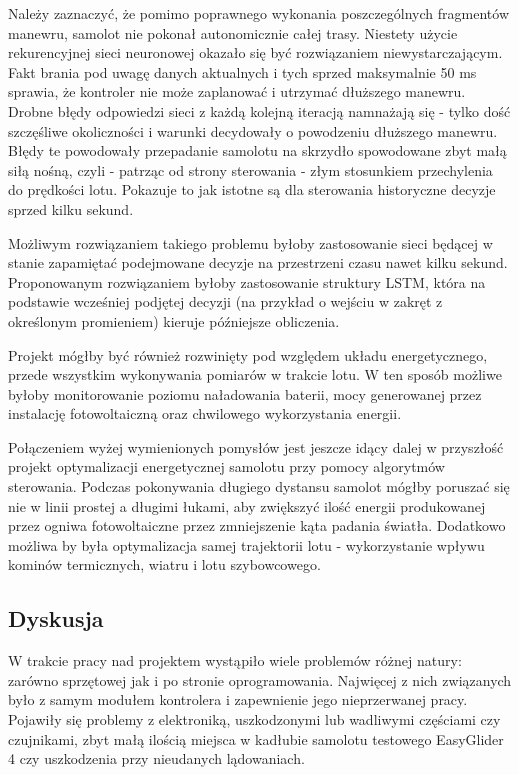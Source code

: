 \documentclass[12pt, a4paper]{article}
\begin{document}
Należy zaznaczyć, że pomimo poprawnego wykonania poszczególnych fragmentów manewru, samolot nie pokonał autonomicznie całej trasy. Niestety użycie rekurencyjnej sieci neuronowej okazało się być rozwiązaniem niewystarczającym. Fakt brania pod uwagę danych aktualnych i tych sprzed maksymalnie 50 ms sprawia, że kontroler nie może zaplanować i utrzymać dłuższego manewru. Drobne błędy odpowiedzi sieci z każdą kolejną iteracją namnażają się - tylko dość szczęśliwe okoliczności i warunki decydowały o powodzeniu dłuższego manewru. Błędy te powodowały przepadanie samolotu na skrzydło spowodowane zbyt małą siłą nośną, czyli - patrząc od strony sterowania - złym stosunkiem przechylenia do prędkości lotu. Pokazuje to jak istotne są dla sterowania historyczne decyzje sprzed kilku sekund.

Możliwym rozwiązaniem takiego problemu byłoby zastosowanie sieci będącej w stanie zapamiętać podejmowane decyzje na przestrzeni czasu nawet kilku sekund. Proponowanym rozwiązaniem byłoby zastosowanie struktury LSTM, która na podstawie wcześniej podjętej decyzji (na przykład o wejściu w zakręt z określonym promieniem) kieruje późniejsze obliczenia.

Projekt mógłby być również rozwinięty pod względem układu energetycznego, przede wszystkim wykonywania pomiarów w trakcie lotu. W ten sposób możliwe byłoby monitorowanie poziomu naładowania baterii, mocy generowanej przez instalację fotowoltaiczną oraz chwilowego wykorzystania energii.

Połączeniem wyżej wymienionych pomysłów jest jeszcze idący dalej w przyszłość projekt optymalizacji energetycznej samolotu przy pomocy algorytmów sterowania. Podczas pokonywania długiego dystansu samolot mógłby poruszać się nie w linii prostej a długimi łukami, aby zwiększyć ilość energii produkowanej przez ogniwa fotowoltaiczne przez zmniejszenie kąta padania światła. Dodatkowo możliwa by była optymalizacja samej trajektorii lotu - wykorzystanie wpływu kominów termicznych, wiatru i lotu szybowcowego.



\subsection{Dyskusja}
W trakcie pracy nad projektem wystąpiło wiele problemów różnej natury: zarówno sprzętowej jak i po stronie oprogramowania. Najwięcej z nich związanych było z samym modułem kontrolera i zapewnienie jego nieprzerwanej pracy. Pojawiły się problemy z elektroniką, uszkodzonymi lub wadliwymi częściami czy czujnikami, zbyt małą ilością miejsca w kadłubie samolotu testowego EasyGlider 4 czy uszkodzenia przy nieudanych lądowaniach. 
\end{document}
